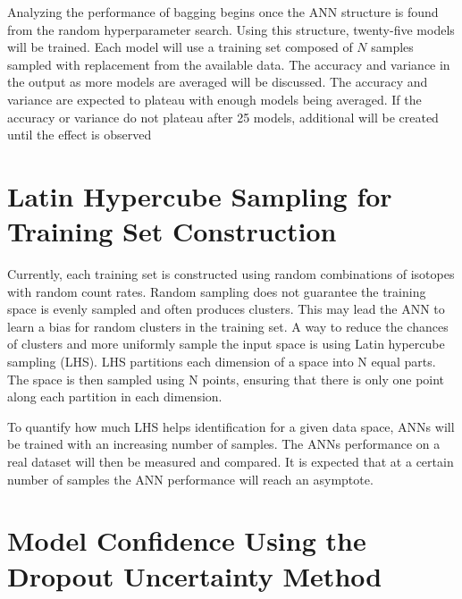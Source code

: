 \documentclass[tocnosub,noragright,centerchapter,12pt,fullpage]{uiucecethesis09}
\begin{document}
Analyzing the performance of bagging begins once the ANN structure is found from the random hyperparameter search. Using this structure, twenty-five models will be trained. Each model will use a training set composed of $N$ samples sampled with replacement from the available data. The accuracy and variance in the output as more models are averaged will be discussed. The accuracy and variance are expected to plateau with enough models being averaged. If the accuracy or variance do not plateau after 25 models, additional will be created until the effect is observed



\section{Latin Hypercube Sampling for Training Set Construction}


Currently, each training set is constructed using random combinations of isotopes with random count rates. Random sampling does not guarantee the training space is evenly sampled and often produces clusters. This may lead the ANN to learn a bias for random clusters in the training set. A way to reduce the chances of clusters and more uniformly sample the input space is using Latin hypercube sampling (LHS). LHS partitions each dimension of a space into N equal parts. The space is then sampled using N points, ensuring that there is only one point along each partition in each dimension. 


To quantify how much LHS helps identification for a given data space, ANNs will be trained with an increasing number of samples. The ANNs performance on a real dataset will then be measured and compared. It is expected that at a certain number of samples the ANN performance will reach an asymptote.



\section{Model Confidence Using the Dropout Uncertainty Method}
\end{document}
